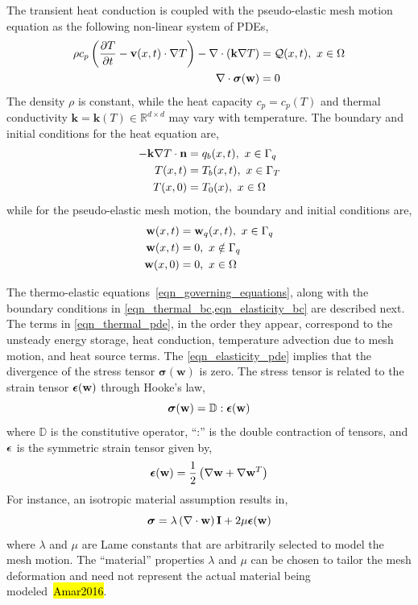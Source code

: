 The transient heat conduction is coupled with the pseudo-elastic mesh motion equation as the following non-linear system of PDEs,
\begin{subequations}
    \begin{align}
        \rho c_p\left(\frac{\partial T}{\partial t} - \mathbf{v}(x,t)\cdot\nabla T\right) - \nabla\cdot (\mathbf{k}\nabla T) &= \mathcal{Q}(x,t),\ x\in\Omega \label{eqn_thermal_pde}\\
        \nabla\cdot\boldsymbol{\sigma}(\mathbf{w}) &= 0\label{eqn_elasticity_pde}
    \end{align}\label{eqn_governing_equations}
\end{subequations}
The density $\rho$ is constant, while the heat capacity $c_p=c_p(T)$ and thermal conductivity $\mathbf{k}=\mathbf{k}(T)\in\mathbb{R}^{d\times d}$ may vary with temperature. The boundary and initial conditions for the heat equation are,
\begin{subequations}
    \begin{align}
        -\mathbf{k}\nabla T\cdot \vn &= q_b(x,t),\ x\in\Gamma_q\label{eqn_thermal_bc_neumann}\\
        T(x,t) &= T_b(x,t),\ x\in\Gamma_T\label{eqn_thermal_bc_dirichlet}\\
        T(x,0) &= T_0(x),\ x\in\Omega\label{eqn_thermal_ic}
    \end{align}\label{eqn_thermal_bc}
\end{subequations}
while for the pseudo-elastic mesh motion, the boundary and initial conditions are,
\begin{subequations}
    \begin{align}
        \mathbf{w}(x,t) &= \mathbf{w}_q(x,t),\ x\in\Gamma_q\\
        \mathbf{w}(x,t) &= 0,\ x\notin\Gamma_q\\
        \mathbf{w}(x,0) &= 0,\ x\in\Omega
    \end{align}\label{eqn_elasticity_bc}
\end{subequations}

The thermo-elastic equations~\cref{eqn_governing_equations}, along with the boundary conditions in \cref{eqn_thermal_bc,eqn_elasticity_bc} are described next. The terms in \cref{eqn_thermal_pde}, in the order they appear, correspond to the unsteady energy storage, heat conduction, temperature advection due to mesh motion, and heat source terms. The \cref{eqn_elasticity_pde} implies that the divergence of the stress tensor $\boldsymbol{\sigma}(\mathbf{w})$ is zero. The stress tensor is related to the strain tensor $\boldsymbol{\epsilon}(\mathbf{w})$ through Hooke's law,
\[
    \boldsymbol{\sigma}(\mathbf{w}) = \mathbb{D}:\boldsymbol{\epsilon}(\mathbf{w})
\]
where $\mathbb{D}$ is the constitutive operator, ``:'' is the double contraction of tensors, and $\boldsymbol{\epsilon}$ is the symmetric strain tensor given by,
\[
    \boldsymbol{\epsilon}(\mathbf{w}) = \frac{1}{2}\left(\nabla\mathbf{w} + \nabla\mathbf{w}^T\right)
\]
For instance, an isotropic material assumption results in,
\[
    \boldsymbol{\sigma} = \lambda\left(\nabla\cdot\mathbf{w}\right) \mathbf{I} + 2\mu\boldsymbol{\epsilon}(\mathbf{w})
\]
where $\lambda$ and $\mu$ are Lame constants that are arbitrarily selected to model the mesh motion. The ``material'' properties $\lambda$ and $\mu$ can be chosen to tailor the mesh deformation and need not represent the actual material being modeled~\hl{Amar2016}. 

